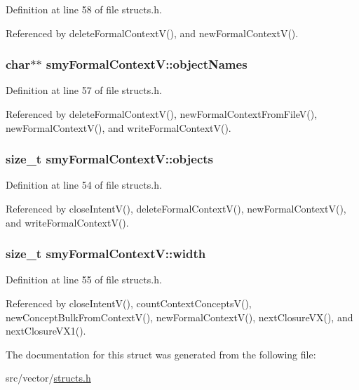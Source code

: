\-Definition at line 58 of file structs.\-h.



\-Referenced by delete\-Formal\-Context\-V(), and new\-Formal\-Context\-V().

\hypertarget{structsmyFormalContextV_aac85d520aa4849d3dfbe4b1c85c17555}{
\subsubsection[{object\-Names}]{\setlength{\rightskip}{0pt plus 5cm}char$\ast$$\ast$ {\bf smy\-Formal\-Context\-V\-::object\-Names}}}\label{structsmyFormalContextV_aac85d520aa4849d3dfbe4b1c85c17555}


\-Definition at line 57 of file structs.\-h.



\-Referenced by delete\-Formal\-Context\-V(), new\-Formal\-Context\-From\-File\-V(), new\-Formal\-Context\-V(), and write\-Formal\-Context\-V().

\hypertarget{structsmyFormalContextV_a6870c7afe6748004c41c81bd5e1c65d2}{
\subsubsection[{objects}]{\setlength{\rightskip}{0pt plus 5cm}size\-\_\-t {\bf smy\-Formal\-Context\-V\-::objects}}}\label{structsmyFormalContextV_a6870c7afe6748004c41c81bd5e1c65d2}


\-Definition at line 54 of file structs.\-h.



\-Referenced by close\-Intent\-V(), delete\-Formal\-Context\-V(), new\-Formal\-Context\-V(), and write\-Formal\-Context\-V().

\hypertarget{structsmyFormalContextV_ab4456c63ae1536d8a9afa9a42c30cd10}{
\subsubsection[{width}]{\setlength{\rightskip}{0pt plus 5cm}size\-\_\-t {\bf smy\-Formal\-Context\-V\-::width}}}\label{structsmyFormalContextV_ab4456c63ae1536d8a9afa9a42c30cd10}


\-Definition at line 55 of file structs.\-h.



\-Referenced by close\-Intent\-V(), count\-Context\-Concepts\-V(), new\-Concept\-Bulk\-From\-Context\-V(), new\-Formal\-Context\-V(), next\-Closure\-V\-X(), and next\-Closure\-V\-X1().



\-The documentation for this struct was generated from the following file\-:\begin{DoxyCompactItemize}
\item 
src/vector/\hyperlink{vector_2structs_8h}{structs.\-h}\end{DoxyCompactItemize}
